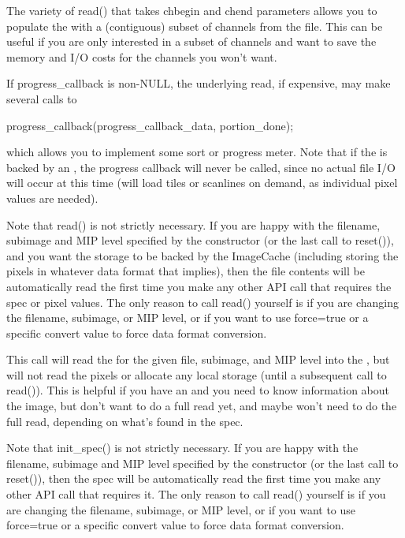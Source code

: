 The variety of {\cf read()} that takes {\cf chbegin} and {\cf chend}
parameters allows you to populate the \ImageBuf with a (contiguous) subset
of channels from the file. This can be useful if you are only interested
in a subset of channels and want to save the memory and I/O costs for the
channels you won't want.

If {\cf progress_callback} is non-NULL, the underlying read, if
expensive, may make several calls to
\begin{code}
  progress_callback(progress_callback_data, portion_done);
\end{code}
\noindent which allows you to implement some sort or progress meter.
Note that if the \ImageBuf is backed by an \ImageCache, the
progress callback will never be called, since no actual file I/O
will occur at this time (\ImageCache will load tiles or scanlines
on demand, as individual pixel values are needed).

Note that {\cf read()} is not strictly necessary. If you are happy with
the filename, subimage and MIP level specified by the \ImageBuf constructor
(or the last call to {\cf reset()}), and you want the storage to be backed
by the {\cf ImageCache} (including storing the pixels in whatever data
format that implies), then the file contents will be automatically read
the first time you make any other \ImageBuf API call that requires the
spec or pixel values.  The only reason to call {\cf read()} yourself is
if you are changing the filename, subimage, or MIP level, or if you want
to use {\cf force=true} or a specific {\cf convert} value to force data
format conversion.
\apiend

This call will read the \ImageSpec for the given file, subimage, and
MIP level into the \ImageBuf, but will not read the pixels or allocate
any local storage (until a subsequent call to {\cf read()}).  This is
helpful if you have an \ImageBuf and you need to know information about
the image, but don't want to do a full read yet, and maybe won't need
to do the full read, depending on what's found in the spec.

Note that {\cf init_spec()} is not strictly necessary. If you are happy with
the filename, subimage and MIP level specified by the \ImageBuf constructor
(or the last call to {\cf reset()}), then the spec will be automatically
read the first time you make any other \ImageBuf API call that requires it.
The only reason to call {\cf read()} yourself is if you are changing the
filename, subimage, or MIP level, or if you want to use {\cf force=true} or
a specific {\cf convert} value to force data format conversion.
\apiend


